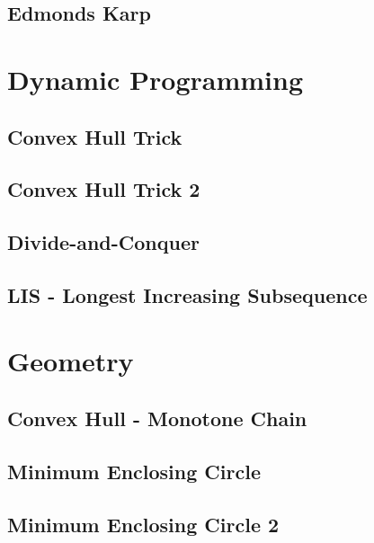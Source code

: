 \subsection{Edmonds Karp}
\raggedbottom
\hrulefill

\section{Dynamic Programming}
\subsection{Convex Hull Trick}
\raggedbottom
\hrulefill
\subsection{Convex Hull Trick 2}
\raggedbottom
\hrulefill
\subsection{Divide-and-Conquer}
\raggedbottom
\hrulefill
\subsection{LIS - Longest Increasing Subsequence}
\raggedbottom
\hrulefill

\section{Geometry}
\subsection{Convex Hull - Monotone Chain}
\raggedbottom
\hrulefill
\subsection{Minimum Enclosing Circle}
\raggedbottom
\hrulefill
\subsection{Minimum Enclosing Circle 2}
\raggedbottom
\hrulefill

